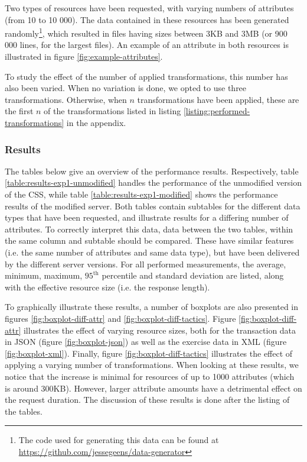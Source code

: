 \noindent Two types of resources have been requested, with varying numbers of attributes (from 10 to 10 000). The data contained in these resources has been generated randomly\footnote{The code used for generating this data can be found at \url{https://github.com/jessegeens/data-generator}}, which resulted in  files having sizes between 3KB and 3MB (or 900 000 lines, for the largest files). An example of an attribute in both resources is illustrated in figure \ref{fig:example-attributes}.

To study the effect of the number of applied transformations, this number has also been varied. When no variation is done, we opted to use three transformations. Otherwise, when $n$ transformations have been applied, these are the first $n$ of the transformations listed in listing \ref{listing:performed-transformations} in the appendix.

\subsubsection{Results}
The tables below give an overview of the performance results. Respectively, table \ref{table:results-exp1-unmodified} handles the performance of the unmodified version of the \gls{CSS}, while table \ref{table:results-exp1-modified} shows the performance results of the modified server. Both tables contain subtables for the different data types that have been requested, and illustrate results for a differing number of attributes. 
To correctly interpret this data, data between the two tables, within the same column and subtable should be compared. These have similar features (i.e. the same number of attributes and same data type), but have been delivered by the different server versions. For all performed measurements, the average, minimum, maximum, $95^{\text{th}}$ percentile and standard deviation are listed, along with the effective resource size (i.e. the response length).

To graphically illustrate these results, a number of boxplots are also presented in figures \ref{fig:boxplot-diff-attr} and \ref{fig:boxplot-diff-tactics}. Figure \ref{fig:boxplot-diff-attr} illustrates the effect of varying resource sizes, both for the transaction data in JSON (figure \ref{fig:boxplot-json}) as well as the exercise data in XML (figure \ref{fig:boxplot-xml}). Finally, figure \ref{fig:boxplot-diff-tactics} illustrates the effect of applying a varying number of transformations. When looking at these results, we notice that the increase is minimal for resources of up to 1000 attributes (which is around 300KB). However, larger attribute amounts have a detrimental effect on the request duration. The discussion of these results is done after the listing of the tables.

